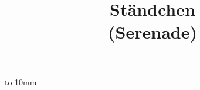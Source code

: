 \documentclass{article}         %
\begin{document}


\def\interstaffline{\vskip2mm}
\def\interscoreline{\vskip3mm}
\vbox to 10mm{\vss}
\title{St\"andchen\normalsize\\[2ex](Serenade)}
\maketit

\end{document}
